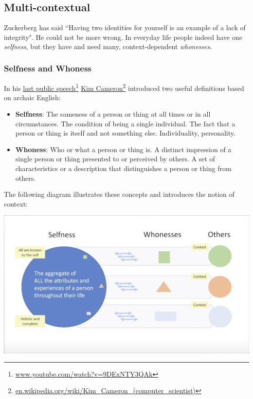 \documentclass[11pt, oneside]{article}   	%
\newcommand{\hyperfootnote}[1][]{\def\ArgI{{#1}}\hyperfootnoteRelay}
\newcommand\hyperfootnoteRelay[2][]{\href{#1#2}{\ArgI}\footnote{\href{#1#2}{#2}}}
\begin{document}
\subsection{Multi-contextual}

Zuckerberg has said ``Having two identities for yourself is an example of a lack of integrity"\cite{Kirkpatrick2011}. He could not be more wrong. In everyday life people indeed have one \emph{selfness}, but they have and need many, context-dependent \emph{whonesses}. 

\subsubsection{Selfness and Whoness}

In his \hyperfootnote[last public speech][https://]{www.youtube.com/watch?v=9DExNTY3QAk}  
\hyperfootnote[Kim Cameron][https://]{en.wikipedia.org/wiki/Kim\_Cameron\_(computer\_scientist)} introduced two useful definitions based on archaic English:

\begin{itemize}
\item \textbf{Selfness}: The sameness of a person or thing at all times or in all circumstances. The condition of being a single individual. The fact that a person or thing is itself and not something else. Individuality, personality. 
\item \textbf{Whoness}: Who or what a person or thing is. A distinct impression of a single person or thing presented to or perceived by others. A set of characteristics or a description that distinguishes a person or thing from others. 
\end{itemize}

The following diagram illustrates these concepts and introduces the notion of context:

\includegraphics[width=\textwidth]{./images/selfness-and-whoness-larger.png}
\end{document}
